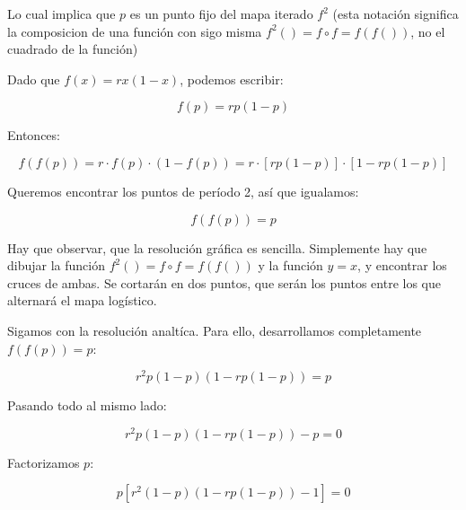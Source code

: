 \documentclass[
  10pt,
  a4paper,
  DIV=11,
  numbers=noendperiod,
  open=any]{scrreprt}
\numberwithin{equation}{chapter}
\numberwithin{equation}{chapter}
\renewcommand{\[}{\begin{equation}}
\renewcommand{\]}{\end{equation}}
\begin{document}
Lo cual implica que \(p\) es un punto fijo del mapa iterado \(f^2\)
(esta notación significa la composicion de una función con sigo misma
\(f^2()=f \circ f = f(f())\), no el cuadrado de la función)

Dado que \(f(x) = r x (1 - x)\), podemos escribir:

\begin{equation}

f(p) = r p (1 - p)

\end{equation}

Entonces:

\begin{equation}

f(f(p)) = r \cdot f(p) \cdot (1 - f(p)) = r \cdot [r p (1 - p)] \cdot \left[1 - r p (1 - p)\right]

\end{equation}

Queremos encontrar los puntos de período 2, así que igualamos:

\begin{equation}

f(f(p)) = p

\end{equation}

Hay que observar, que la resolución gráfica es sencilla. Simplemente hay
que dibujar la función \(f^2()=f \circ f = f(f())\) y la función
\(y=x\), y encontrar los cruces de ambas. Se cortarán en dos puntos, que
serán los puntos entre los que alternará el mapa logístico.

Sigamos con la resolución analtíca. Para ello, desarrollamos
completamente \(f(f(p)) = p\):

\begin{equation}

r^2 p (1 - p)(1 - r p (1 - p)) = p

\end{equation}

Pasando todo al mismo lado:

\begin{equation}

r^2 p (1 - p)(1 - r p (1 - p)) - p = 0

\end{equation}

Factorizamos \(p\):

\begin{equation}

p \left[ r^2 (1 - p)(1 - r p (1 - p)) - 1 \right] = 0

\end{equation}
\end{document}
